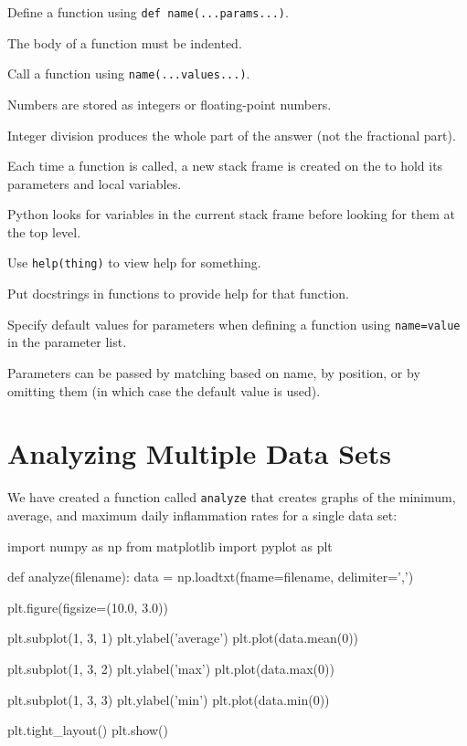 \begin{keypoints}
\begin{swcitemize}
\item
  Define a function using \texttt{def name(...params...)}.
\item
  The body of a function must be indented.
\item
  Call a function using \texttt{name(...values...)}.
\item
  Numbers are stored as integers or floating-point numbers.
\item
  Integer division produces the whole part of the answer (not the
  fractional part).
\item
  Each time a function is called, a new stack frame is created on the
   to hold its parameters and local
  variables.
\item
  Python looks for variables in the current stack frame before looking
  for them at the top level.
\item
  Use \texttt{help(thing)} to view help for something.
\item
  Put docstrings in functions to provide help for that function.
\item
  Specify default values for parameters when defining a function using
  \texttt{name=value} in the parameter list.
\item
  Parameters can be passed by matching based on name, by position, or by
  omitting them (in which case the default value is used).
\end{swcitemize}
\end{keypoints}

\section{Analyzing Multiple Data Sets}

We have created a function called \texttt{analyze} that creates graphs
of the minimum, average, and maximum daily inflammation rates for a
single data set:

\begin{VerbIn}
import numpy as np
from matplotlib import pyplot as plt

def analyze(filename):
    data = np.loadtxt(fname=filename, delimiter=',')

    plt.figure(figsize=(10.0, 3.0))

    plt.subplot(1, 3, 1)
    plt.ylabel('average')
    plt.plot(data.mean(0))

    plt.subplot(1, 3, 2)
    plt.ylabel('max')
    plt.plot(data.max(0))

    plt.subplot(1, 3, 3)
    plt.ylabel('min')
    plt.plot(data.min(0))

    plt.tight_layout()
    plt.show()
\end{VerbIn}

